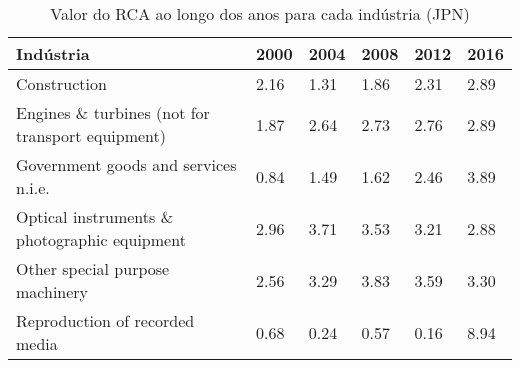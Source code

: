 \begin{table}
\centering
\caption{Valor do RCA ao longo dos anos para cada indústria (JPN)}
\label{tab:ex3-tempo-JPN}
\begin{tabular}{p{6cm}p{1.5cm}p{1.5cm}p{1.5cm}p{1.5cm}p{1.5cm}}
\toprule
                                       Indústria & 2000 & 2004 & 2008 & 2012 & 2016 \\
\midrule
                                    Construction & 2.16 & 1.31 & 1.86 & 2.31 & 2.89 \\
Engines \& turbines (not for transport equipment) & 1.87 & 2.64 & 2.73 & 2.76 & 2.89 \\
            Government goods and services n.i.e. & 0.84 & 1.49 & 1.62 & 2.46 & 3.89 \\
    Optical instruments \& photographic equipment & 2.96 & 3.71 & 3.53 & 3.21 & 2.88 \\
                 Other special purpose machinery & 2.56 & 3.29 & 3.83 & 3.59 & 3.30 \\
                  Reproduction of recorded media & 0.68 & 0.24 & 0.57 & 0.16 & 8.94 \\
\bottomrule
\end{tabular}
\end{table}
